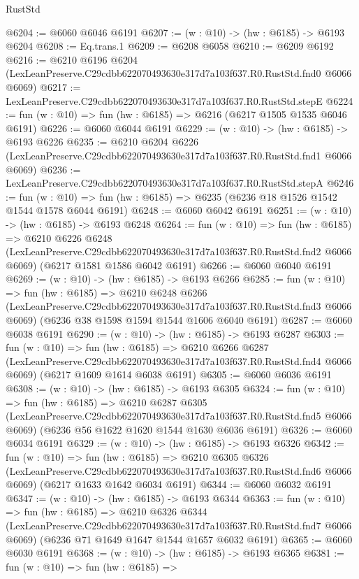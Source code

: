 \begin{lexlean}{RustStd}
\begin{coremodule}
@6204 := @6060 @6046 @6191
@6207 := (w : @10) -> (hw : @6185) -> @6193 @6204
@6208 := Eq.trans.{1}
@6209 := @6208 @6058
@6210 := @6209 @6192
@6216 := @6210
    @6196
    @6204
    (LexLeanPreserve.C29cdbb622070493630e317d7a103f637.R0.RustStd.fnd0 @6066 @6069)
@6217 := LexLeanPreserve.C29cdbb622070493630e317d7a103f637.R0.RustStd.stepE
@6224 := fun (w : @10) => fun (hw : @6185) => @6216 (@6217 @1505 @1535 @6046 @6191)
@6226 := @6060 @6044 @6191
@6229 := (w : @10) -> (hw : @6185) -> @6193 @6226
@6235 := @6210
    @6204
    @6226
    (LexLeanPreserve.C29cdbb622070493630e317d7a103f637.R0.RustStd.fnd1 @6066 @6069)
@6236 := LexLeanPreserve.C29cdbb622070493630e317d7a103f637.R0.RustStd.stepA
@6246 := fun (w : @10) => fun (hw : @6185) => @6235 (@6236 @18 @1526 @1542 @1544 @1578 @6044 @6191)
@6248 := @6060 @6042 @6191
@6251 := (w : @10) -> (hw : @6185) -> @6193 @6248
@6264 := fun (w : @10) =>
  fun (hw : @6185) =>
  @6210
    @6226
    @6248
    (LexLeanPreserve.C29cdbb622070493630e317d7a103f637.R0.RustStd.fnd2 @6066 @6069)
    (@6217 @1581 @1586 @6042 @6191)
@6266 := @6060 @6040 @6191
@6269 := (w : @10) -> (hw : @6185) -> @6193 @6266
@6285 := fun (w : @10) =>
  fun (hw : @6185) =>
  @6210
    @6248
    @6266
    (LexLeanPreserve.C29cdbb622070493630e317d7a103f637.R0.RustStd.fnd3 @6066 @6069)
    (@6236 @38 @1598 @1594 @1544 @1606 @6040 @6191)
@6287 := @6060 @6038 @6191
@6290 := (w : @10) -> (hw : @6185) -> @6193 @6287
@6303 := fun (w : @10) =>
  fun (hw : @6185) =>
  @6210
    @6266
    @6287
    (LexLeanPreserve.C29cdbb622070493630e317d7a103f637.R0.RustStd.fnd4 @6066 @6069)
    (@6217 @1609 @1614 @6038 @6191)
@6305 := @6060 @6036 @6191
@6308 := (w : @10) -> (hw : @6185) -> @6193 @6305
@6324 := fun (w : @10) =>
  fun (hw : @6185) =>
  @6210
    @6287
    @6305
    (LexLeanPreserve.C29cdbb622070493630e317d7a103f637.R0.RustStd.fnd5 @6066 @6069)
    (@6236 @56 @1622 @1620 @1544 @1630 @6036 @6191)
@6326 := @6060 @6034 @6191
@6329 := (w : @10) -> (hw : @6185) -> @6193 @6326
@6342 := fun (w : @10) =>
  fun (hw : @6185) =>
  @6210
    @6305
    @6326
    (LexLeanPreserve.C29cdbb622070493630e317d7a103f637.R0.RustStd.fnd6 @6066 @6069)
    (@6217 @1633 @1642 @6034 @6191)
@6344 := @6060 @6032 @6191
@6347 := (w : @10) -> (hw : @6185) -> @6193 @6344
@6363 := fun (w : @10) =>
  fun (hw : @6185) =>
  @6210
    @6326
    @6344
    (LexLeanPreserve.C29cdbb622070493630e317d7a103f637.R0.RustStd.fnd7 @6066 @6069)
    (@6236 @71 @1649 @1647 @1544 @1657 @6032 @6191)
@6365 := @6060 @6030 @6191
@6368 := (w : @10) -> (hw : @6185) -> @6193 @6365
@6381 := fun (w : @10) =>
  fun (hw : @6185) =>

\end{coremodule}
\end{lexlean}
